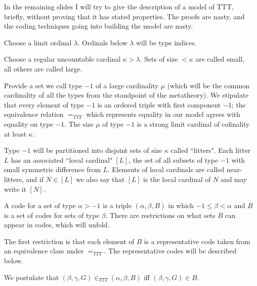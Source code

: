 \documentclass{slides}
\begin{document}
\begin{slide}

In the remaining slides I will try to give the description of a model of TTT, briefly, without proving that it has stated properties.  The proofs are nasty, and the coding techniques going into building the model are nasty.

Choose a limit ordinal $\lambda$.  Ordinals below $\lambda$ will be type indices.

Choose a regular uncountable cardinal $\kappa>\lambda$.  Sets of size $<\kappa$ are called small, all others are called large.

Provide a set we call type $-1$ of a large cardinality $\mu$ (which will be the common cardinality of all the types from the standpoint of the metatheory).  We stipulate that every element of type $-1$ is an ordered triple with first component $-1$;
the equivalence relation $=_{TTT}$ which represents equality in our model agrees with equality on type $-1$.  The size $\mu$ of type $-1$ is a strong limit cardinal of cofinality at least $\kappa$.

Type $-1$ will be partitioned into disjoint sets of size $\kappa$ called ``litters".  Each litter $L$  has an associated ``local cardinal" $[L]$, the set of all subsets of type $-1$ with small symmetric difference from $L$.  Elements of local cardinals are called near-litters, and if $N \in [L]$ we also say that $[L]$ is the local cardinal of $N$ and may write it $[N]$.

\end{slide}

\begin{slide}

A code for a set of type $\alpha>-1$ is a triple $(\alpha,\beta,B)$ in which $-1\leq \beta<\alpha$ and $B$ is a set of codes for sets of type $\beta$.  There are restrictions on what sets $B$ can appear in codes, which will unfold.

The first restriction is that each element of $B$ is a representative code taken from an equivalence class under $=_{TTT}$.  The representative codes will be described below.

We postulate that $(\beta,\gamma,G) \in_{TTT} (\alpha,\beta,B)$ iff $(\beta,\gamma,G) \in B$.  

\end{slide}
\end{document}

